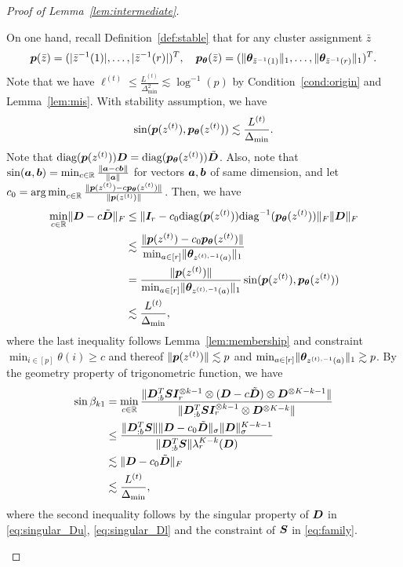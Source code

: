 \documentclass[lettersize,onecolumn,journal]{IEEEtran}
\theoremstyle{definition}
\theoremstyle{definition}
\begin{document}
\begin{proof}[Proof of Lemma~\ref{lem:intermediate}]
\begin{enumerate}
    On one hand, recall Definition~\ref{def:stable} that for any cluster assignment $\bar z$
    \begin{equation}
        \bm{p}(\bar z)=(|\bar z^{-1}(1)|, \ldots,|\bar z^{-1}(r)|)^T,\quad \bm{p}_{\boldsymbol{\theta}}(\bar z)=(\lVert\boldsymbol{\theta}_{\bar z^{-1}(1)}\rVert_1,\ldots,\lVert\boldsymbol{\theta}_{\bar z^{-1}(r)}\rVert_1)^T.
    \end{equation}
    Note that we have $\ell^{(t)} \leq \frac{L^{(t)}}{\Delta_{\min}^2} \lesssim \log^{-1}(p) $ by Condition~\ref{cond:origin} and Lemma~\ref{lem:mis}. With stability assumption, we have 
    \begin{equation}
         \sin (\bm{p}(z^{(t)}), \bm{p}_{\boldsymbol{\theta}}(z^{(t)})) \lesssim \frac{L^{(t)}}{\Delta_{\min}}. 
    \end{equation}
    Note that $\text{diag}(\bm{p}(z^{(t)})) \bm{D} = \text{diag}(\bm{p}_{\boldsymbol{\theta}}(z^{(t)})) \tilde {\bm{D}}$. Also, note that $\sin(\bm{a},\bm{b}) =\min_{c \in \mathbb{R}} \frac{ \lVert\bm{a} - c\bm{b}\rVert }{\lVert\bm{a}\rVert}$ for vectors $\bm{a},\bm{b}$ of same dimension, and let $c_0 = \operatorname*{arg\,min}_{c \in \mathbb{R}} \frac{\lVert\bm{p}(z^{(t)}) - c\bm{p}_{\boldsymbol{\theta}}(z^{(t)})\rVert}{\lVert\bm{p}(z^{(t)})\rVert}$. Then, we have
    \begin{align}
       \min_{c \in \mathbb{R}} \lVert \bm{D} - c \tilde {\bm{D}}\rVert_F &\leq  \lVert \bm I_r - c_0 \text{diag}(\bm{p}(z^{(t)})) \text{diag}^{-1}(\bm{p}_{\boldsymbol{\theta}}(z^{(t)}))\rVert_F \lVert\bm{D}\rVert_F\\
       &\lesssim \frac{ \lVert \bm{p}(z^{(t)}) - c_0\bm{p}_{\boldsymbol{\theta}}(z^{(t)})\rVert }{\min_{a \in [r]} \lVert\boldsymbol{\theta}_{z^{(t),-1}(a)} \rVert_1  } \\
       & = \frac{\lVert \bm{p}(z^{(t)})\rVert }{\min_{a \in [r]} \lVert\boldsymbol{\theta}_{z^{(t),-1}(a)} \rVert_1 } \sin (\bm{p}(z^{(t)}), \bm{p}_{\boldsymbol{\theta}}(z^{(t)}))\\
       & \lesssim \frac{L^{(t)}}{\Delta_{\min}},
    \end{align}
    where the last inequality follows Lemma~\ref{lem:membership} and constraint $\min_{i \in [p]}\theta(i) \geq c$ and thereof $\lVert \bm{p}(z^{(t)})\rVert \lesssim p$ and $\min_{a \in [r]} \lVert\boldsymbol{\theta}_{z^{(t),-1}(a)} \rVert_1  \gtrsim p$. By the geometry property of trigonometric function, we have
    \begin{align}
        \sin \beta_{k1} &= \min_{c \in \mathbb{R}} \frac{\lVert\bm{D}_{:b}^{T} \bm S \bm I_r^{\otimes k-1} \otimes (\bm{D} - c \tilde {\bm{D}}) \otimes \bm{D}^{\otimes K-k - 1} \rVert }{ \lVert\bm{D}_{:b}^{T} \bm S \bm I_r^{\otimes k-1} \otimes \bm{D}^{\otimes K-k}\rVert }\\
        &\leq \frac{ \lVert\bm{D}_{:b}^{T} \bm S\rVert \lVert\bm{D} - c_0 \tilde {\bm{D}}\rVert_{\sigma} \lVert\bm{D}\rVert_{\sigma}^{K-k-1} }{\lVert\bm{D}_{:b}^{T} \bm S\rVert \lambda_r^{K-k}(\bm{D}) }\\
        & \lesssim  \lVert\bm{D} - c_0 \tilde {\bm{D}}\rVert_{F}\\
        & \lesssim \frac{L^{(t)}}{\Delta_{\min}},
    \end{align}
    where the second inequality follows by the singular property of $\bm{D}$ in \eqref{eq:singular_Du}, \eqref{eq:singular_Dl} and the constraint of $\bm S$ in \eqref{eq:family}.
    

\end{enumerate}
\end{proof}
\end{document}
